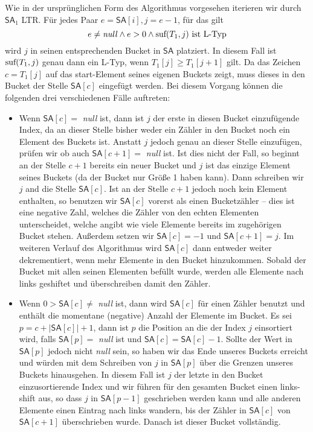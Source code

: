 Wie in der ursprünglichen Form des Algorithmus vorgesehen iterieren wir durch $\mathsf{SA}_1$ LTR. Für jedes Paar $e = \mathsf{SA}[i], j = e -1$, für das gilt
\[
	e \neq \text{\textit{null}} \wedge e > 0  \wedge \text{suf}(T_1,j) \text{ ist L-Typ} 
\]
wird $j$ in seinen entsprechenden Bucket in $\mathsf{SA}$ platziert. In diesem Fall ist $\text{suf}(T_1,j)$ genau dann ein L-Typ, wenn $T_1[j] \geq T_1[j+1]$ gilt. Da das Zeichen $c = T_1[j]$ auf das start-Element seines eigenen Buckets zeigt, muss dieses in den Bucket der Stelle $\mathsf{SA}[c]$ eingefügt werden. Bei diesem Vorgang können die folgenden drei verschiedenen Fälle auftreten:

\begin{itemize}
\item Wenn $\mathsf{SA}[c] = $ \textit{null} ist, dann ist $j$ der erste in diesen Bucket einzufügende Index, da an dieser Stelle bisher weder ein Zähler in den Bucket noch ein Element des Buckets ist. Anstatt $j$ jedoch genau an dieser Stelle einzufügen, prüfen wir ob auch $\mathsf{SA}[c+1]  = $ \textit{null} ist. Ist dies nicht der Fall, so beginnt an der Stelle $c+1$ bereits ein neuer Bucket und $j$ ist das einzige Element seines Buckets (da der Bucket nur Größe 1 haben kann). Dann schreiben wir $j$ and die Stelle $\mathsf{SA}[c]$. Ist an der Stelle $c+1$ jedoch noch kein Element enthalten, so benutzen wir $\mathsf{SA}[c]$ vorerst als einen Bucketzähler -- dies ist eine negative Zahl, welches die Zähler von den echten Elementen unterscheidet, welche angibt wie viele Elemente bereits im zugehörigen Bucket stehen. Außerdem setzen wir $\mathsf{SA}[c] = -1$ und $\mathsf{SA}[c+1] = j$. Im weiteren Verlauf des Algorithmus wird $\mathsf{SA}[c]$ dann entweder weiter dekrementiert, wenn mehr Elemente in den Bucket hinzukommen. Sobald der Bucket mit allen seinen Elementen befüllt wurde, werden alle Elemente nach links geshiftet und überschreiben damit den Zähler.

\item Wenn $ 0 > \mathsf{SA}[c] \neq$ \textit{null} ist, dann wird $\mathsf{SA}[c]$ für einen Zähler benutzt und enthält die momentane (negative) Anzahl der Elemente im Bucket. Es sei $p = c + |\mathsf{SA}[c]| + 1$, dann ist $p$ die Position an die der Index $j$ einsortiert wird, falls $\mathsf{SA}[p] = $ \textit{null} ist und $\mathsf{SA}[c] = \mathsf{SA}[c] - 1$. Sollte der Wert in $\mathsf{SA}[p]$ jedoch nicht \textit{null} sein, so haben wir das Ende unseres Buckets erreicht und würden mit dem Schreiben von $j$ in $\mathsf{SA}[p]$ über die Grenzen unseres Buckets hinausgehen. In diesem Fall ist $j$ der letzte in den Bucket einzusortierende Index und wir führen für den gesamten Bucket einen links-shift aus, so dass $j$ in $\mathsf{SA}[p-1]$ geschrieben werden kann und alle anderen Elemente einen Eintrag nach links wandern, bis der Zähler in $\mathsf{SA}[c]$ von $\mathsf{SA}[c+1]$ überschrieben wurde. Danach ist dieser Bucket vollständig.


\end{itemize}
